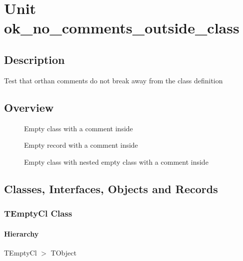 \documentclass{report}
\newif\ifpdf
\begin{document}
\label{toc}\tableofcontents
\newpage
\newlength{\tmplength}
\chapter{Unit ok{\_}no{\_}comments{\_}outside{\_}class}
\label{ok_no_comments_outside_class}
\section{Description}
Test that orthan comments do not break away from the class definition
\section{Overview}
\begin{description}
\item[\texttt{\begin{ttfamily}TEmptyCl\end{ttfamily} Class}]Empty class with a comment inside
\item[\texttt{\begin{ttfamily}TEmptyRec\end{ttfamily} Record}]Empty record with a comment inside
\item[\texttt{\begin{ttfamily}TEmptyClWithNested\end{ttfamily} Class}]Empty class with nested empty class with a comment inside
\end{description}
\section{Classes, Interfaces, Objects and Records}
\ifpdf
\subsection*{\large{\textbf{TEmptyCl Class}}\normalsize\hspace{1ex}\hrulefill}
\else
\subsection*{TEmptyCl Class}
\fi
\label{ok_no_comments_outside_class.TEmptyCl}
\subsubsection*{\large{\textbf{Hierarchy}}\normalsize\hspace{1ex}\hfill}
TEmptyCl {$>$} TObject
\end{document}
